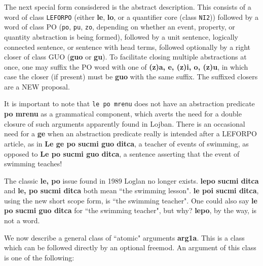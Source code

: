 \documentclass[12pt]{book}
\begin{document}
The next special form consisdered is the abstract description.  This consists of a word of class {\tt LEFORPO} (either {\bf le}, {\bf lo}, or a quantifier core (class {\tt NI2})) followed by a word
of class PO ({\tt po}, {\tt pu}, {\tt zo}, depending on whether an event, property, or quantity abstraction is being formed), followed by a unit sentence, logically connected sentence, or sentence with head terms, followed optionally by a right closer of class GUO ({\bf guo} or {\bf gu}).  To facilitate closing multiple abstractions at once, one may suffix the PO word
with one of {\bf (z)a, e, (z)i, o, (z)u}, in which case the closer (if present) must be {\bf guo} with the same suffix.  The suffixed closers are a NEW proposal.

It is important to note that {\tt le po mrenu} does not have an abstraction predicate {\bf po mrenu} as a grammatical component, which averts the need for a double closure of such arguments apparently found in Lojban.  There is an occasional need for a {\bf ge} when an abstraction predicate really is intended after a LEFORPO article, as in
{\bf Le ge po sucmi guo ditca}, a teacher of events of swimming, as opposed to {\bf Le po sucmi guo ditca}, a sentence asserting that the event of swimming teaches!

The classic {\bf le, po} issue found in 1989 Loglan no longer exists.  {\bf lepo sucmi ditca} and {\bf le, po sucmi ditca} both mean ``the swimming lesson".  {\bf le poi sucmi ditca}, using the new short scope form, is ``the swimming teacher".  One could also say {\bf le po sucmi guo ditca} for ``the swimming teacher", but why?   {\bf lepo}, by the way, is not a word.

We now describe a general class of ``atomic" arguments {\bf arg1a}.  This is a class which can be followed directly by an optional freemod.  An argument of this class is one of the following:
\end{document}
